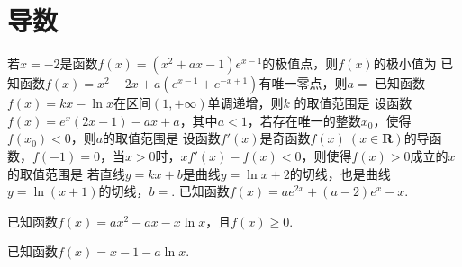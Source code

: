 \documentclass{BHCexam}
\begin{document}
\section{导数}
\begin{questions}
	\qs 若$ x=-2 $是函数$f(x)=\left(x^2+ax-1\right)e^{x-1}$的极值点，则$f(x)$的极小值为\xx
	\qs 已知函数$f(x)=x^2-2x+a(e^{x-1}+e^{-x+1})$有唯一零点，则$ a= $\xx
	\qs 已知函数$f(x)=kx-\ln x$在区间$ \left(1,+\infty\right) $单调递增，则$ k $	的取值范围是\xx
	\onech{$ \left(-\infty,-2\right]$}{$ \left(-\infty,-1\right]$}{$ \left[2,+\infty\right)$}{$ \left[1,+\infty\right)$}
	\qs 设函数$f(x)=e^x\left(2x-1\right)-ax+a$，其中$ a<1 $，若存在唯一的整数$ x_0 $，使得$ f(x_0)<0 $，则$ a $的取值范围是\xx
	\onech{$ \left[-\dfrac{3}{2e},1\right)$}{$ \left[-\dfrac{3}{2e},\dfrac{3}{4}\right)$}{$\left[\dfrac{3}{2e},\dfrac{3}{4}\right) $}{$\left[\dfrac{3}{2e},1\right) $}
	\question
	设函数$f'(x)$是奇函数$f(x)~(x\in \mathbf{R})$的导函数，$f(-1)=0$，当$x>0$时，$xf'(x)-f(x)<0$，则使得$f(x)>0$成立的$x$的取值范围是\xx
	\qs 若直线$ y=kx+b $是曲线$ y=\ln x+2 $的切线，也是曲线$ y=\ln\left(x+1\right) $的切线，$b=$\tk.
	\qs 已知函数$f(x)=ae^{2x}+(a-2)e^x-x$.
\qs 已知函数$f(x)=ax^2-ax-x\ln x $，且$f(x)\ge0$.
\qs 已知函数$f(x)=x-1-a\ln x$.
\end{questions}
\end{document}
